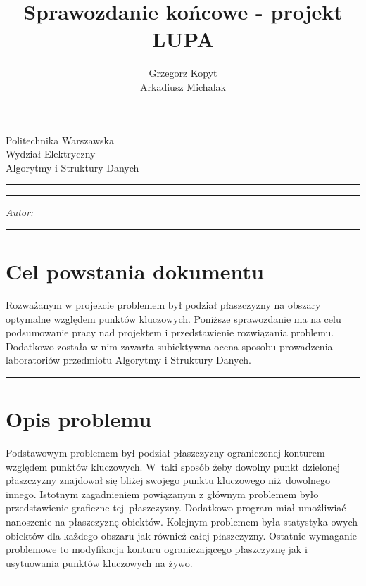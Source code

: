 \documentclass[a4paper,11pt]{article}
\author{Grzegorz Kopyt\\Arkadiusz Michalak}
\title{Sprawozdanie końcowe - projekt LUPA}
\makeatletter
\newcommand{\linia}{\rule{\linewidth}{0.4mm}}
\renewcommand{\maketitle}{\begin{titlepage}
    \vspace*{2cm}
    \begin{center}\LARGE
    Politechnika Warszawska\\
    Wydział Elektryczny\\
    Algorytmy i Struktury Danych\\
    \end{center}
    \vspace{5cm}
    \noindent\linia
    \begin{center}
      \LARGE \textsc{\@title}
         \end{center}
     \linia
    \vspace{0.5cm}
    \begin{flushright}
    \begin{minipage}{5cm}
    \textit{Autor:}\\
    \normalsize \textsc{\@author} \par
    \end{minipage}
    \vspace{5cm}
     \end{flushright}
    \vspace*{\stretch{6}}
    \begin{center}
    \@date
    \end{center}
  \end{titlepage}
}
\makeatother
\begin{document}
\maketitle

\tableofcontents
\vspace{1cm}
\noindent\linia
\section{Cel powstania dokumentu}
Rozważanym w projekcie problemem był podział płaszczyzny na obszary optymalne względem punktów kluczowych. Poniższe sprawozdanie ma na celu podsumowanie pracy nad projektem i przedstawienie rozwiązania problemu. Dodatkowo została w nim zawarta subiektywna ocena sposobu prowadzenia laboratoriów przedmiotu Algorytmy i Struktury Danych.

\noindent\linia
\section{Opis problemu}
Podstawowym problemem był podział płaszczyzny ograniczonej konturem względem punktów kluczowych. W~taki sposób żeby dowolny punkt dzielonej płaszczyzny znajdował się bliżej swojego punktu kluczowego niż~dowolnego innego. Istotnym zagadnieniem powiązanym z głównym problemem było przedstawienie graficzne tej~płaszczyzny. Dodatkowo program miał umożliwiać nanoszenie na płaszczyznę obiektów. Kolejnym problemem była statystyka owych obiektów dla każdego obszaru jak również całej płaszczyzny. Ostatnie wymaganie problemowe to modyfikacja konturu ograniczającego płaszczyznę jak i usytuowania punktów kluczowych na żywo. 

\noindent\linia
\end{document}
